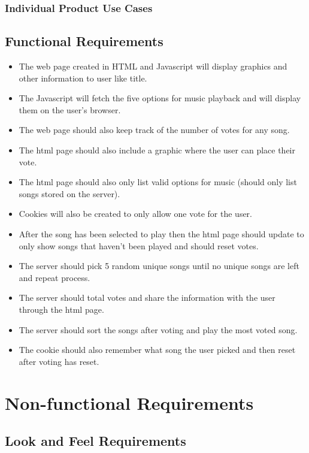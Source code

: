 \documentclass[12pt, titlepage]{article}
\begin{document}
\subsubsection{Individual Product Use Cases}

\subsection{Functional Requirements}
\begin{itemize}
\item The web page created in HTML and Javascript will display graphics and other information to user like title. 
\item The Javascript will fetch the five options for music playback and will display them on the user's browser.
\item The web page should also keep track of the number of votes for any song.
\item The html page should also include a graphic where the user can place their vote.
\item The html page should also only list valid options for music (should only list songs stored on the server).
\item Cookies will also be created to only allow one vote for the user.
\item After the song has been selected to play then the html page should update to only show songs that haven't been played and should reset votes.
\item The server should pick 5 random unique songs until no unique songs are left and repeat process. 
\item The server should total votes and share the information with the user through the html page.
\item The server should sort the songs after voting and play the most voted song.
\item The cookie should also remember what song the user picked and then reset after voting has reset.
\end{itemize}

\section{Non-functional Requirements}

\subsection{Look and Feel Requirements}
\end{document}
